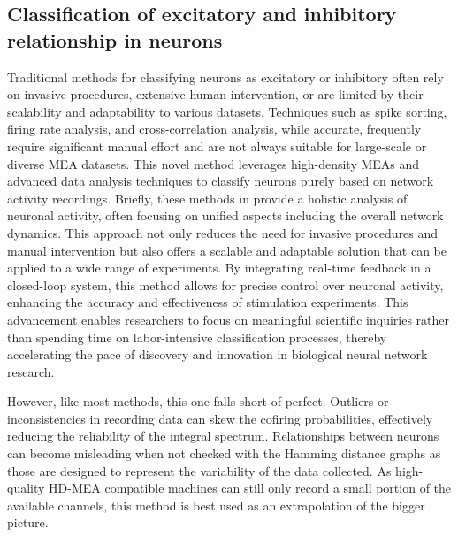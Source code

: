\documentclass{article} %
\begin{document}
\subsection{Classification of excitatory and inhibitory relationship in neurons}
Traditional methods for classifying neurons as excitatory or inhibitory often rely on invasive procedures, extensive human intervention, or are limited by their scalability and adaptability to various datasets. Techniques such as spike sorting, firing rate analysis, and cross-correlation analysis, while accurate, frequently require significant manual effort and are not always suitable for large-scale or diverse MEA datasets. This novel method leverages high-density MEAs and advanced data analysis techniques to classify neurons purely based on network activity recordings. Briefly, these methods in provide a holistic analysis of neuronal activity, often focusing on unified aspects including the overall network dynamics. This approach not only reduces the need for invasive procedures and manual intervention but also offers a scalable and adaptable solution that can be applied to a wide range of experiments. By integrating real-time feedback in a closed-loop system, this method allows for precise control over neuronal activity, enhancing the accuracy and effectiveness of stimulation experiments. This advancement enables researchers to focus on meaningful scientific inquiries rather than spending time on labor-intensive classification processes, thereby accelerating the pace of discovery and innovation in biological neural network research.

However, like most methods, this one falls short of perfect. Outliers or inconsistencies in recording data can skew the cofiring probabilities, effectively reducing the reliability of the integral spectrum. Relationships between neurons can become misleading when not checked with the Hamming distance graphs as those are designed to represent the variability of the data collected. As high-quality HD-MEA compatible machines can still only record a small portion of the available channels, this method is best used as an extrapolation of the bigger picture.
\end{document}
